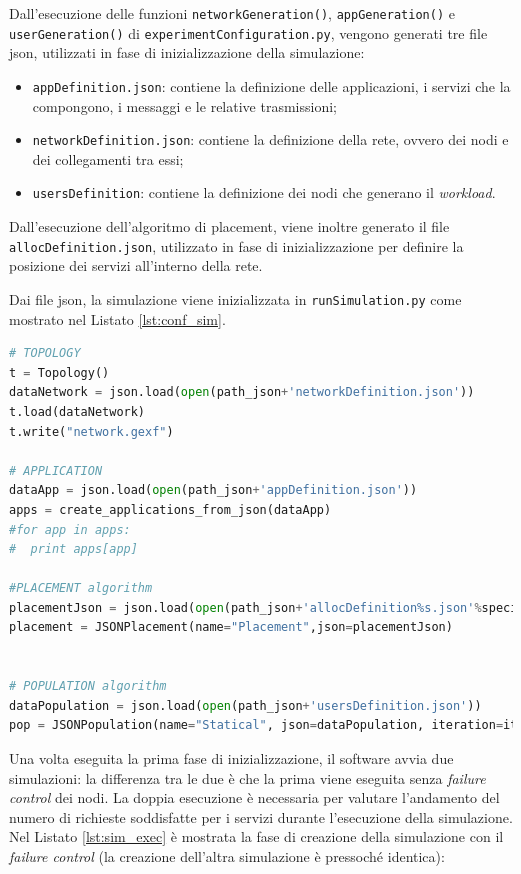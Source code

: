 Dall'esecuzione delle funzioni \texttt{networkGeneration()}, \texttt{appGeneration()} e \texttt{userGeneration()} di \texttt{experimentConfiguration.py}, vengono generati tre file json, utilizzati in fase di inizializzazione della simulazione:
\begin{itemize}
	\item \texttt{appDefinition.json}: contiene la definizione delle applicazioni, i servizi che la compongono, i messaggi e le relative trasmissioni;
	\item \texttt{networkDefinition.json}: contiene la definizione della rete, ovvero dei nodi e dei collegamenti tra essi;
	\item \texttt{usersDefinition}: contiene la definizione dei nodi che generano il \textit{workload}.
\end{itemize}

Dall'esecuzione dell'algoritmo di placement, viene inoltre generato il file \texttt{allocDefinition.json}, utilizzato in fase di inizializzazione per definire la posizione dei servizi all'interno della rete. 

Dai file json, la simulazione viene inizializzata in \texttt{runSimulation.py} come mostrato nel Listato \ref{lst:conf_sim}.

\begin{lstlisting}[language=python, captionpos=b, caption={Configurazione della simulazione da file json.}, label={lst:conf_sim}]
# TOPOLOGY
t = Topology()
dataNetwork = json.load(open(path_json+'networkDefinition.json'))
t.load(dataNetwork)
t.write("network.gexf")
    
# APPLICATION
dataApp = json.load(open(path_json+'appDefinition.json'))
apps = create_applications_from_json(dataApp)
#for app in apps:
#  print apps[app]

#PLACEMENT algorithm
placementJson = json.load(open(path_json+'allocDefinition%s.json'%specificSuffix))
placement = JSONPlacement(name="Placement",json=placementJson)


# POPULATION algorithm
dataPopulation = json.load(open(path_json+'usersDefinition.json'))
pop = JSONPopulation(name="Statical", json=dataPopulation, iteration=it)
\end{lstlisting}

Una volta eseguita la prima fase di inizializzazione, il software avvia due simulazioni: la differenza tra le due è che la prima viene eseguita senza \textit{failure control} dei nodi. La doppia esecuzione è necessaria per valutare l'andamento del numero di richieste soddisfatte per i servizi durante l'esecuzione della simulazione. Nel Listato \ref{lst:sim_exec} è mostrata la fase di creazione della simulazione con il \textit{failure control} (la creazione dell'altra simulazione è pressoché identica):

